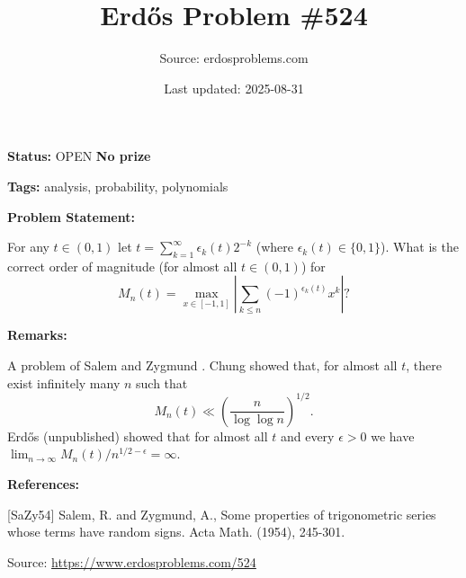 \documentclass{article}
\title{Erd\H{o}s Problem \#524}
\date{Last updated: 2025-08-31}
\author{Source: erdosproblems.com}
\begin{document}
\maketitle

\noindent\textbf{Status:} OPEN \quad \textbf{No prize}

\noindent\textbf{Tags:} analysis, probability, polynomials

\medskip
\noindent\textbf{Problem Statement:}

For any $t\in (0,1)$ let $t=\sum_{k=1}^\infty \epsilon_k(t)2^{-k}$ (where $\epsilon_k(t)\in \{0,1\}$). What is the correct order of magnitude (for almost all $t\in(0,1)$) for\[M_n(t)=\max_{x\in [-1,1]}\left\lvert \sum_{k\leq n}(-1)^{\epsilon_k(t)}x^k\right\rvert?\]

\bigskip
\noindent\textbf{Remarks:}

A problem of Salem and Zygmund \cite{SaZy54}. Chung showed that, for almost all $t$, there exist infinitely many $n$ such that\[M_n(t) \ll \left(\frac{n}{\log\log n}\right)^{1/2}.\]Erd\H{o}s (unpublished) showed that for almost all $t$ and every $\epsilon>0$ we have $\lim_{n\to \infty}M_n(t)/n^{1/2-\epsilon}=\infty$.

\bigskip
\noindent\textbf{References:}

[SaZy54] Salem, R. and Zygmund, A., Some properties of trigonometric series whose terms have
random signs. Acta Math. (1954), 245-301.

\bigskip
\noindent\small{Source: \url{https://www.erdosproblems.com/524}}
\end{document}
